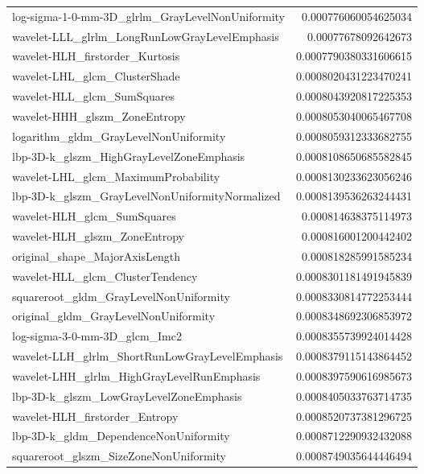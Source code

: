 {\begin{xltabular}[H]{\textwidth}{X r}
        log-sigma-1-0-mm-3D\_glrlm\_GrayLevelNonUniformity & 0.000776060054625034 \\
        wavelet-LLL\_glrlm\_LongRunLowGrayLevelEmphasis & 0.00077678092642673 \\
        wavelet-HLH\_firstorder\_Kurtosis & 0.0007790380331606615 \\
        wavelet-LHL\_glcm\_ClusterShade & 0.0008020431223470241 \\
        wavelet-HLL\_glcm\_SumSquares & 0.0008043920817225353 \\
        wavelet-HHH\_glszm\_ZoneEntropy & 0.0008053040065467708 \\
        logarithm\_gldm\_GrayLevelNonUniformity & 0.0008059312333682755 \\
        lbp-3D-k\_glszm\_HighGrayLevelZoneEmphasis & 0.0008108650685582845 \\
        wavelet-LHL\_glcm\_MaximumProbability & 0.0008130233623056246 \\
        lbp-3D-k\_glszm\_GrayLevelNonUniformityNormalized & 0.0008139536263244431 \\
        wavelet-HLH\_glcm\_SumSquares & 0.000814638375114973 \\
        wavelet-HLH\_glszm\_ZoneEntropy & 0.000816001200442402 \\
        original\_shape\_MajorAxisLength & 0.000818285991585234 \\
        wavelet-HLL\_glcm\_ClusterTendency & 0.0008301181491945839 \\
        squareroot\_gldm\_GrayLevelNonUniformity & 0.0008330814772253444 \\
        original\_gldm\_GrayLevelNonUniformity & 0.0008348692306853972 \\
        log-sigma-3-0-mm-3D\_glcm\_Imc2 & 0.0008355739924014428 \\
        wavelet-LLH\_glrlm\_ShortRunLowGrayLevelEmphasis & 0.0008379115143864452 \\
        wavelet-LHH\_glrlm\_HighGrayLevelRunEmphasis & 0.0008397590616985673 \\
        lbp-3D-k\_glszm\_LowGrayLevelZoneEmphasis & 0.0008405033763714735 \\
        wavelet-HLH\_firstorder\_Entropy & 0.0008520737381296725 \\
        lbp-3D-k\_gldm\_DependenceNonUniformity & 0.0008712290932432088 \\
        squareroot\_glszm\_SizeZoneNonUniformity & 0.0008749035644446494 \\

\end{xltabular}}
